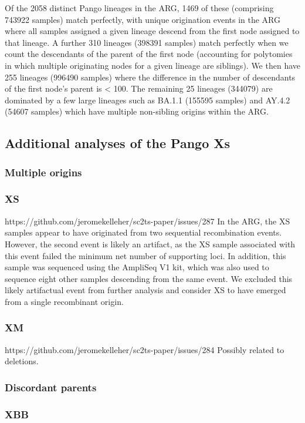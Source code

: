 \documentclass[12pt,letterpaper]{article}
\begin{document}
Of the 2058 distinct Pango lineages in the ARG, 
1469 of these (comprising 743922 samples) match perfectly, 
with unique origination events in the ARG 
where all samples assigned a given lineage descend from the first node assigned to that lineage. 
A further 310 lineages (398391 samples) match perfectly 
when we count the descendants of the parent of the first node 
(accounting for polytomies in which multiple originating nodes for a given lineage are siblings). 
We then have 255 lineages (996490 samples) 
where the difference in the number of descendants of the first node's parent is < 100. 
The remaining 25 lineages (344079) are dominated by a few large lineages such as BA.1.1 (155595 samples) and AY.4.2 (54607 samples) 
which have multiple non-sibling origins within the ARG.

\subsection*{Additional analyses of the Pango Xs}
\subsubsection*{Multiple origins}
\subsubsection*{XS}
https://github.com/jeromekelleher/sc2ts-paper/issues/287
In the ARG, the XS samples appear to have originated from two sequential recombination events. 
However, the second event is likely an artifact, 
as the XS sample associated with this event failed the minimum net number of supporting loci. 
In addition, this sample was sequenced using the AmpliSeq V1 kit, 
which was also used to sequence eight other samples descending from the same event. 
We excluded this likely artifactual event from further analysis and 
consider XS to have emerged from a single recombinant origin.

\subsubsection*{XM}
https://github.com/jeromekelleher/sc2ts-paper/issues/284
Possibly related to deletions.

\subsubsection*{Discordant parents}
\subsubsection*{XBB}
\end{document}
